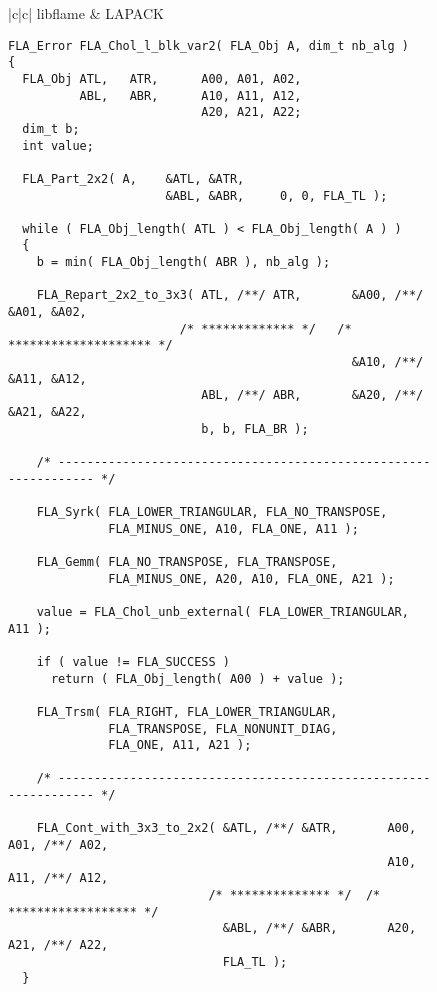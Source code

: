 \begin{figure}[tbp]
\begin{center}
\begin{tabular}{|c|c|}
\hline
libflame & LAPACK \\ \hline
\begin{minipage}[t]{3in}
{\tiny
\begin{verbatim}
FLA_Error FLA_Chol_l_blk_var2( FLA_Obj A, dim_t nb_alg )
{
  FLA_Obj ATL,   ATR,      A00, A01, A02,
          ABL,   ABR,      A10, A11, A12,
                           A20, A21, A22;
  dim_t b;
  int value;

  FLA_Part_2x2( A,    &ATL, &ATR,
                      &ABL, &ABR,     0, 0, FLA_TL );

  while ( FLA_Obj_length( ATL ) < FLA_Obj_length( A ) )
  {
    b = min( FLA_Obj_length( ABR ), nb_alg );

    FLA_Repart_2x2_to_3x3( ATL, /**/ ATR,       &A00, /**/ &A01, &A02,
                        /* ************* */   /* ******************** */
                                                &A10, /**/ &A11, &A12,
                           ABL, /**/ ABR,       &A20, /**/ &A21, &A22,
                           b, b, FLA_BR );

    /* ---------------------------------------------------------------- */

    FLA_Syrk( FLA_LOWER_TRIANGULAR, FLA_NO_TRANSPOSE, 
              FLA_MINUS_ONE, A10, FLA_ONE, A11 );

    FLA_Gemm( FLA_NO_TRANSPOSE, FLA_TRANSPOSE, 
              FLA_MINUS_ONE, A20, A10, FLA_ONE, A21 );

    value = FLA_Chol_unb_external( FLA_LOWER_TRIANGULAR, A11 );

    if ( value != FLA_SUCCESS )
      return ( FLA_Obj_length( A00 ) + value );

    FLA_Trsm( FLA_RIGHT, FLA_LOWER_TRIANGULAR, 
              FLA_TRANSPOSE, FLA_NONUNIT_DIAG, 
              FLA_ONE, A11, A21 );

    /* ---------------------------------------------------------------- */

    FLA_Cont_with_3x3_to_2x2( &ATL, /**/ &ATR,       A00, A01, /**/ A02,
                                                     A10, A11, /**/ A12,
                            /* ************** */  /* ****************** */
                              &ABL, /**/ &ABR,       A20, A21, /**/ A22,
                              FLA_TL );
  }


\end{verbatim}}
\end{minipage}
\end{tabular}
\end{center}
\end{figure}
